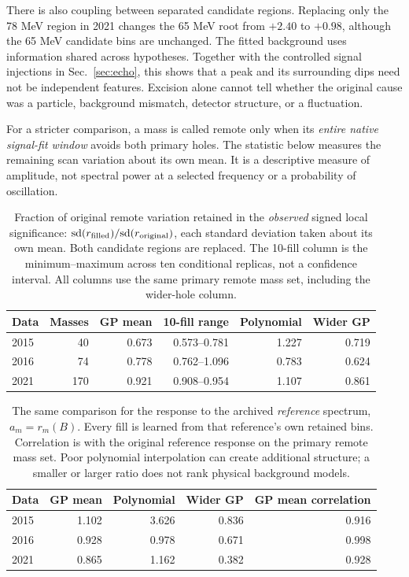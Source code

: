 There is also coupling between separated candidate regions. Replacing only the 78 MeV region in 2021 changes the 65 MeV root from $+2.40$ to $+0.98$, although the 65 MeV candidate bins are unchanged. The fitted background uses information shared across hypotheses. Together with the controlled signal injections in Sec.~\ref{sec:echo}, this shows that a peak and its surrounding dips need not be independent features. Excision alone cannot tell whether the original cause was a particle, background mismatch, detector structure, or a fluctuation.

For a stricter comparison, a mass is called remote only when its \emph{entire native signal-fit window} avoids both primary holes. The statistic below measures the remaining scan variation about its own mean. It is a descriptive measure of amplitude, not spectral power at a selected frequency or a probability of oscillation.
\begin{table}[H]
\centering\small
\begin{tabular}{lrrrrr}
\toprule
Data & Masses & GP mean & 10-fill range & Polynomial & Wider GP \\
\midrule
2015 & 40 & 0.673 & 0.573--0.781 & 1.227 & 0.719 \\
2016 & 74 & 0.778 & 0.762--1.096 & 0.783 & 0.624 \\
2021 & 170 & 0.921 & 0.908--0.954 & 1.107 & 0.861 \\
\bottomrule
\end{tabular}
\caption{Fraction of original remote variation retained in the \emph{observed} signed local significance: $\mathrm{sd}(r_{\rm filled})/\mathrm{sd}(r_{\rm original})$, each standard deviation taken about its own mean. Both candidate regions are replaced. The 10-fill column is the minimum--maximum across ten conditional replicas, not a confidence interval. All columns use the same primary remote mass set, including the wider-hole column.}\label{tab:removal-remote}
\end{table}

\begin{table}[H]
\centering\small
\begin{tabular}{lrrrr}
\toprule
Data & GP mean & Polynomial & Wider GP & GP mean correlation \\
\midrule
2015 & 1.102 & 3.626 & 0.836 & 0.916 \\
2016 & 0.928 & 0.978 & 0.671 & 0.998 \\
2021 & 0.865 & 1.162 & 0.382 & 0.928 \\
\bottomrule
\end{tabular}
\caption{The same comparison for the response to the archived \emph{reference} spectrum, $a_m=r_m(B)$. Every fill is learned from that reference's own retained bins. Correlation is with the original reference response on the primary remote mass set. Poor polynomial interpolation can create additional structure; a smaller or larger ratio does not rank physical background models.}\label{tab:removal-reference}
\end{table}

